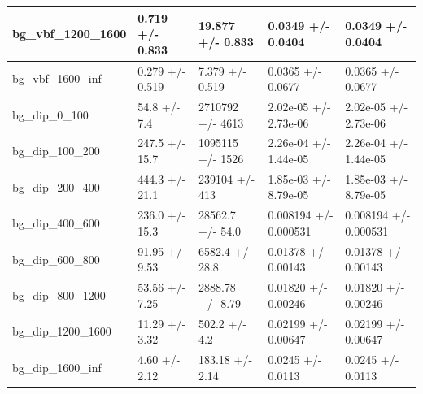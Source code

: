 \documentclass[a4paper, 10pt]{article}
\begin{document}
\begin{table}[H]
\begin{center}
\begin{tabular}{|m{20.0mm}|m{27.0mm}|m{27.0mm}|m{33.0mm}|m{32.0mm}|}
      \hline
      {\cellcolor{white}         bg\_vbf\_1200\_1600}& {\cellcolor{white}         0.719 +/\-- 0.833}& {\cellcolor{white}         19.877 +/\-- 0.833}& {\cellcolor{white}         0.0349 +/\-- 0.0404}& {\cellcolor{white}         0.0349 +/\-- 0.0404}\\
      \hline
      {\cellcolor{white}         bg\_vbf\_1600\_inf}& {\cellcolor{white}         0.279 +/\-- 0.519}& {\cellcolor{white}         7.379 +/\-- 0.519}& {\cellcolor{white}         0.0365 +/\-- 0.0677}& {\cellcolor{white}         0.0365 +/\-- 0.0677}\\
      \hline
      {\cellcolor{white}         bg\_dip\_0\_100}& {\cellcolor{white}         54.8 +/\-- 7.4}& {\cellcolor{white}         2710792 +/\-- 4613}& {\cellcolor{white}         2.02e-05 +/\-- 2.73e-06}& {\cellcolor{white}         2.02e-05 +/\-- 2.73e-06}\\
      \hline
      {\cellcolor{white}         bg\_dip\_100\_200}& {\cellcolor{white}         247.5 +/\-- 15.7}& {\cellcolor{white}         1095115 +/\-- 1526}& {\cellcolor{white}         2.26e-04 +/\-- 1.44e-05}& {\cellcolor{white}         2.26e-04 +/\-- 1.44e-05}\\
      \hline
      {\cellcolor{white}         bg\_dip\_200\_400}& {\cellcolor{white}         444.3 +/\-- 21.1}& {\cellcolor{white}         239104 +/\-- 413}& {\cellcolor{white}         1.85e-03 +/\-- 8.79e-05}& {\cellcolor{white}         1.85e-03 +/\-- 8.79e-05}\\
      \hline
      {\cellcolor{white}         bg\_dip\_400\_600}& {\cellcolor{white}         236.0 +/\-- 15.3}& {\cellcolor{white}         28562.7 +/\-- 54.0}& {\cellcolor{white}         0.008194 +/\-- 0.000531}& {\cellcolor{white}         0.008194 +/\-- 0.000531}\\
      \hline
      {\cellcolor{white}         bg\_dip\_600\_800}& {\cellcolor{white}         91.95 +/\-- 9.53}& {\cellcolor{white}         6582.4 +/\-- 28.8}& {\cellcolor{white}         0.01378 +/\-- 0.00143}& {\cellcolor{white}         0.01378 +/\-- 0.00143}\\
      \hline
      {\cellcolor{white}         bg\_dip\_800\_1200}& {\cellcolor{white}         53.56 +/\-- 7.25}& {\cellcolor{white}         2888.78 +/\-- 8.79}& {\cellcolor{white}         0.01820 +/\-- 0.00246}& {\cellcolor{white}         0.01820 +/\-- 0.00246}\\
      \hline
      {\cellcolor{white}         bg\_dip\_1200\_1600}& {\cellcolor{white}         11.29 +/\-- 3.32}& {\cellcolor{white}         502.2 +/\-- 4.2}& {\cellcolor{white}         0.02199 +/\-- 0.00647}& {\cellcolor{white}         0.02199 +/\-- 0.00647}\\
      \hline
      {\cellcolor{white}         bg\_dip\_1600\_inf}& {\cellcolor{white}         4.60 +/\-- 2.12}& {\cellcolor{white}         183.18 +/\-- 2.14}& {\cellcolor{white}         0.0245 +/\-- 0.0113}& {\cellcolor{white}         0.0245 +/\-- 0.0113}\\
\hline
    \end{tabular}
  \end{center}
\end{table}
\end{document}
